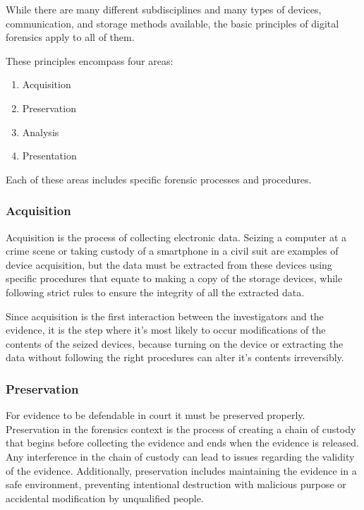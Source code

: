 While there are many different subdisciplines and many types of devices, communication,
and storage methods available, the basic principles of digital forensics
apply to all of them.

These principles encompass four areas:

\begin{enumerate}
\item Acquisition
\item Preservation
\item Analysis
\item Presentation
\end{enumerate}

Each of these areas includes specific forensic processes and procedures.

\subsubsection{Acquisition}

Acquisition is the process of collecting electronic data. Seizing a computer at a crime scene or
taking custody of a smartphone in a civil suit are examples of device acquisition, but the data 
must be extracted from these devices using specific procedures that equate to making a copy of
the storage devices, while following strict rules to ensure the integrity of all the extracted data.

Since acquisition is the first interaction between the investigators and the evidence,
it is the step where it's most likely to occur modifications of the contents of the seized devices,
because turning on the device or extracting the data without following the right procedures can alter
it's contents irreversibly.

\subsubsection{Preservation}

For evidence to be defendable in court it must be preserved properly.
Preservation in the forensics context is the process of creating a chain of custody
that begins before collecting the evidence and ends when the evidence is released.
Any interference in the chain of custody can lead to issues regarding the validity of the evidence.
Additionally, preservation includes maintaining the evidence in a safe environment, preventing
intentional destruction with malicious purpose or accidental modification by unqualified people.

